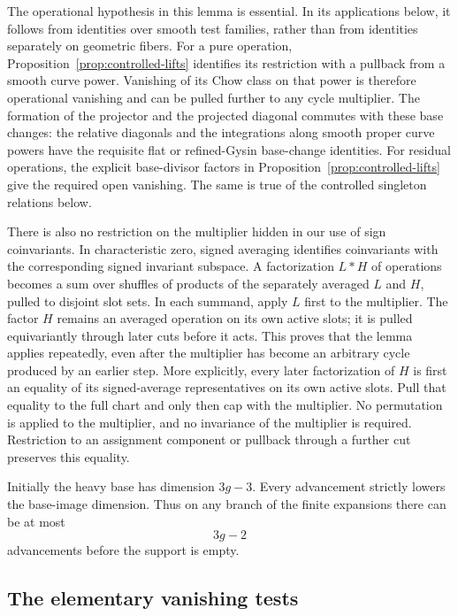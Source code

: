The operational hypothesis in this lemma is essential.  In its
applications below, it follows from identities over smooth test
families, rather than from identities separately on geometric fibers.
For a pure operation, Proposition~\ref{prop:controlled-lifts} identifies
its restriction with a pullback from a smooth curve power.  Vanishing
of its Chow class on that power is therefore operational vanishing and
can be pulled further to any cycle multiplier.  The formation of the
projector and the projected diagonal commutes with these base changes:
the relative diagonals and the integrations along smooth proper curve
powers have the requisite flat or refined-Gysin base-change identities.
For residual operations, the explicit base-divisor factors in
Proposition~\ref{prop:controlled-lifts} give the required open vanishing.
The same is true of the controlled singleton relations below.

There is also no restriction on the multiplier hidden in our use of
sign coinvariants.  In characteristic zero, signed averaging identifies
coinvariants with the corresponding signed invariant subspace.  A
factorization \(L*H\) of operations becomes a sum over shuffles of
products of the separately averaged \(L\) and \(H\), pulled to disjoint
slot sets.  In each summand, apply \(L\) first to the multiplier.
The factor \(H\) remains an averaged operation on its own active slots;
it is pulled equivariantly through later cuts before it acts.
This proves that the lemma applies repeatedly, even after the multiplier
has become an arbitrary cycle produced by an earlier step.
More explicitly, every later factorization of \(H\) is first an equality
of its signed-average representatives on its own active slots.  Pull
that equality to the full chart and only then cap with the multiplier.
No permutation is applied to the multiplier, and no invariance of the
multiplier is required.  Restriction to an assignment component or
pullback through a further cut preserves this equality.

Initially the heavy base has dimension \(3g-3\).  Every advancement
strictly lowers the base-image dimension.  Thus on any branch of the
finite expansions there can be at most
\begin{equation}
\label{eq:advancement-number}
 3g-2
\end{equation}
advancements before the support is empty.

\subsection{The elementary vanishing tests}

